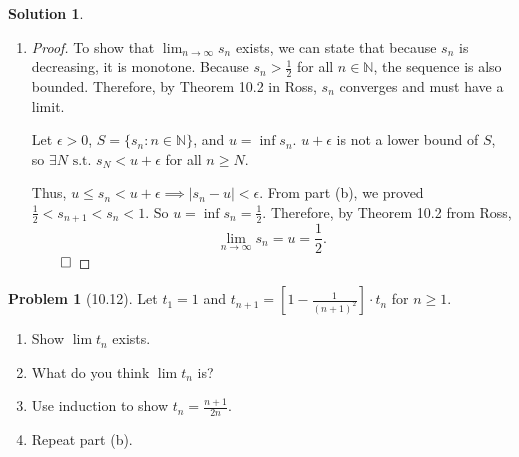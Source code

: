 \documentclass[12pt]{article}
\theoremstyle{definition} %
\newtheorem{solution}{Solution}
\newtheorem{problem}{Problem}
\theoremstyle{plain} %
\begin{document}
\begin{solution}
\begin{enumerate}
\begin{proof}
            The last line was proved by induction in part (b) of this problem. So \(s_n\) is decreasing. \(\qed\)
        \end{proof}
        \item \begin{proof}
            To show that \(\lim_{n \to \infty} s_n\) exists, we can state that because \(s_n\) is decreasing, it is monotone. Because \(s_n > \frac{1}{2}\) for all \(n \in \mathbb{N}\), the sequence is also bounded. Therefore, by Theorem 10.2 in Ross, \(s_n\) converges and must have a limit.
        
            Let \(\epsilon > 0\), \(S = \{s_n : n \in \mathbb{N}\}\), and \(u = \inf s_n\). \(u + \epsilon\) is not a lower bound of \(S\), so \(\exists N \text{ s.t. } s_N < u + \epsilon\) for all \(n \geq N\).
        
            Thus, \(u \leq s_n < u + \epsilon \implies |s_n - u| < \epsilon\). From part (b), we proved \(\frac{1}{2} < s_{n+1} < s_n < 1\). So \(u = \inf s_n = \frac{1}{2}\). Therefore, by Theorem 10.2 from Ross, 
            \[
            \lim_{n \to \infty} s_n = u = \frac{1}{2}.
            \]
            \(\qed\)
        \end{proof}
    \end{enumerate}
\end{solution}

\begin{problem}[10.12]
    Let $t_1 = 1$ and $t_{n+1} = \left[1 - \frac{1}{(n+1)^2}\right] \cdot t_n$ for $n \geq 1$.
    \begin{enumerate}[label=(\alph*)]
        \item Show $\lim t_n$ exists.
        \item What do you think $\lim t_n$ is?
        \item Use induction to show $t_n = \frac{n+1}{2n}$.
        \item Repeat part (b).
    \end{enumerate}
\end{problem}
\end{document}

